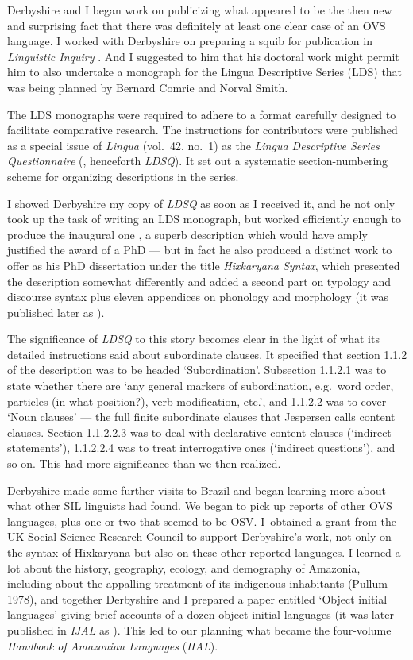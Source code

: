 \documentclass[output=paper,colorlinks,citecolor=brown
]{langscibook}
\begin{document}
Derbyshire and I began work on publicizing what appeared to be the then
new and surprising fact that there was definitely at least one clear
case of an OVS language. I worked with Derbyshire on preparing a squib
for publication in \textit{Linguistic Inquiry} \citep{Derbyshire77}.
And I suggested to him that his doctoral work might permit him to
also undertake a monograph for the Lingua Descriptive Series (LDS)
that was being planned by Bernard Comrie and Norval Smith.

The LDS monographs were required to adhere to a format carefully designed
to facilitate comparative research. The instructions for contributors
were published as a special issue of \textit{Lingua} (vol.~42, no.~1)
as the \textit{Lingua Descriptive Series Questionnaire}
(\citealt{ComrSmit77}, henceforth \textit{LDSQ}). It set out a systematic
section-numbering scheme for organizing descriptions in the series.

I showed Derbyshire my copy of \textit{LDSQ} as soon as I received it, and
he not only took up the task of writing an LDS monograph, but worked
efficiently enough to produce the inaugural one \citep{Derbyshire79},
a superb description which would have amply justified the award of a
PhD --- but in fact he also produced a distinct work to offer as his
PhD dissertation under the title \textit{Hixkaryana Syntax}, which
presented the description somewhat differently and added a second
part on typology and discourse syntax plus eleven appendices on
phonology and morphology (it was published later as
\citealt{Derbyshire85}).

The significance of \textit{LDSQ} to this story becomes clear in
the light of what its detailed instructions said about subordinate
clauses. It specified that section 1.1.2 of the description was to
be headed `Subordination'. Subsection 1.1.2.1 was to state whether
there are `any general markers of subordination, e.g.\ word order,
particles (in what position?), verb modification, etc.', and 1.1.2.2
was to cover `Noun clauses' --- the full finite subordinate clauses
that Jespersen calls content clauses. Section 1.1.2.2.3 was to deal
with declarative content clauses (`indirect statements'), 1.1.2.2.4
was to treat interrogative ones (`indirect questions'), and so on.
This had more significance than we then realized.

Derbyshire made some further visits to Brazil and began learning more about
what other SIL linguists had found. We began to pick up reports of
other OVS languages, plus one or two that seemed to be OSV. I~obtained
a grant from the UK Social Science Research Council to support Derbyshire's
work, not only on the syntax of Hixkaryana but also on these other
reported languages. I learned a lot about the history, geography,
ecology, and demography of Amazonia, including about the appalling
treatment of its indigenous inhabitants (Pullum 1978), and together
Derbyshire and I prepared a paper entitled `Object initial languages' giving
brief accounts of a dozen object-initial languages (it was later
published in \textit{IJAL} as \citealt{DerbPull81}). This led to our
planning what became the four-volume \textit{Handbook of Amazonian
Languages} (\textit{HAL}).
\end{document}

